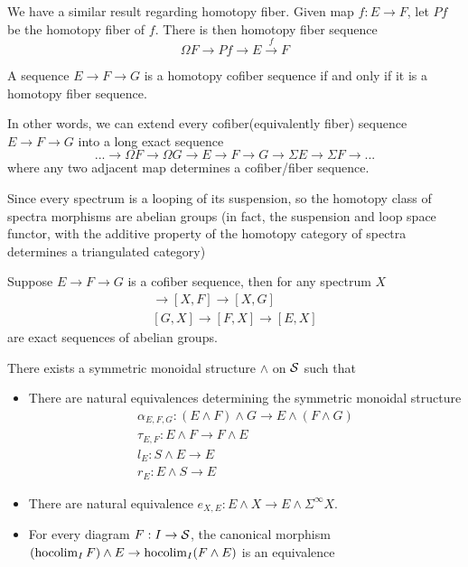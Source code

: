 We have a similar result regarding homotopy fiber. Given map $f: E\to F$, let $Pf$ be the homotopy fiber of $f$. There is then homotopy fiber sequence
\[
\Omega F\to Pf\to E\xrightarrow{f}F 
\]

\begin{proposition}
    A sequence $E\to F\to G$ is a homotopy cofiber sequence if and only if it is a homotopy fiber sequence.
\end{proposition}

In other words, we can extend every cofiber(equivalently fiber) sequence $E\to F\to G$ into a long exact sequence
\[
...\to \Omega F\to \Omega G\to E\to F\to G \to \Sigma E\to \Sigma F\to ...
\]
where any two adjacent map determines a cofiber/fiber sequence.

Since every spectrum is a looping of its suspension, so the homotopy class of spectra morphisms are abelian groups (in fact, the suspension and loop space functor, with the additive property of the homotopy category of spectra determines a triangulated category)

\begin{proposition}
Suppose $E\to F\to G$ is a cofiber sequence, then for any spectrum $X$
\begin{align*}
[X, E]\to [X, F]\to [X, G]
\\ [G, X]\to [F, X]\to [E, X]
\end{align*}
are exact sequences of abelian groups.
\end{proposition}

\begin{theorem}
    \cite{PreRudyak}
    There exists a symmetric monoidal structure $\wedge$ on $\operatorname{\mathcal{S}}$ such that 
    \begin{itemize}
        \item There are natural equivalences determining the symmetric monoidal structure
        \begin{align*}
            \alpha_{E,F,G}: (E\wedge F)\wedge G \to E\wedge (F\wedge G)
            \\ \tau_{E,F}: E\wedge F\to F\wedge E
            \\ l_E: S \wedge E\to E
            \\ r_E: E\wedge S\to E 
        \end{align*}
        \item There are natural equivalence $e_{X, E}: E\wedge X\to E\wedge \Sigma^\infty X$.
        \item For every diagram $F: I \to \operatorname{\mathcal{S}}$, the canonical morphism $(\operatorname{hocolim}_I F)\wedge E\to \operatorname{hocolim}_I(F\wedge E)$ is an equivalence
    \end{itemize}
\end{theorem}

